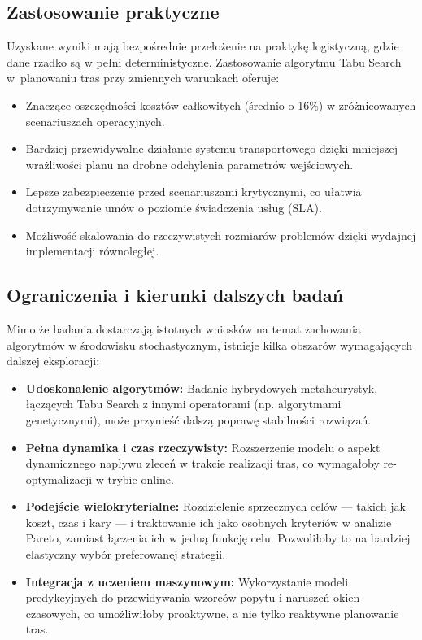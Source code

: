 \subsection{Zastosowanie praktyczne}

Uzyskane wyniki mają bezpośrednie przełożenie na praktykę logistyczną, gdzie dane rzadko są w pełni deterministyczne. Zastosowanie algorytmu Tabu Search w~planowaniu tras przy zmiennych warunkach oferuje:
\begin{itemize}
    \item Znaczące oszczędności kosztów całkowitych (średnio o 16\%) w zróżnicowanych scenariuszach operacyjnych.
    \item Bardziej przewidywalne działanie systemu transportowego dzięki mniejszej wrażliwości planu na drobne odchylenia parametrów wejściowych.
    \item Lepsze zabezpieczenie przed scenariuszami krytycznymi, co ułatwia dotrzymywanie umów o poziomie świadczenia usług (SLA).
    \item Możliwość skalowania do rzeczywistych rozmiarów problemów dzięki wydajnej implementacji równoległej.
\end{itemize}

\subsection{Ograniczenia i kierunki dalszych badań}

Mimo że badania dostarczają istotnych wniosków na temat zachowania algorytmów w środowisku stochastycznym, istnieje kilka obszarów wymagających dalszej eksploracji:

\begin{itemize}
    \item \textbf{Udoskonalenie algorytmów:} Badanie hybrydowych metaheurystyk, łączących Tabu Search z innymi operatorami (np. algorytmami genetycznymi), może przynieść dalszą poprawę stabilności rozwiązań.
    
    \item \textbf{Pełna dynamika i czas rzeczywisty:} Rozszerzenie modelu o aspekt dynamicznego napływu zleceń w trakcie realizacji tras, co wymagałoby re-optymalizacji w trybie online.
    
   \item \textbf{Podejście wielokryterialne:} Rozdzielenie sprzecznych celów — takich jak koszt, czas i kary — i traktowanie ich jako osobnych kryteriów w analizie Pareto, zamiast łączenia ich w jedną funkcję celu. Pozwoliłoby to na bardziej elastyczny wybór preferowanej strategii.
    
    \item \textbf{Integracja z uczeniem maszynowym:} Wykorzystanie modeli predykcyjnych do przewidywania wzorców popytu i naruszeń okien czasowych, co umożliwiłoby proaktywne, a nie tylko reaktywne planowanie tras.
\end{itemize}

